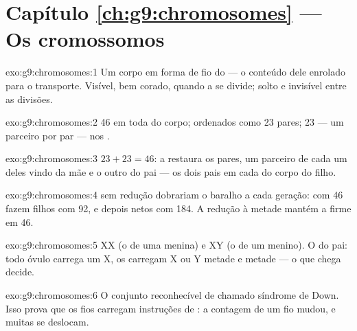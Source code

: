 \section*{Capítulo \ref{ch:g9:chromosomes} --- Os cromossomos}

\begin{solution}{exo:g9:chromosomes:1}
Um corpo em forma de fio do  --- o conteúdo dele
enrolado para o transporte. Visível, bem corado, quando a
 se divide; solto e invisível entre as divisões.
\end{solution}

\begin{solution}{exo:g9:chromosomes:2}
46 em toda  do corpo; ordenados como 23 pares; 23 ---
um parceiro por par --- nos .
\end{solution}

\begin{solution}{exo:g9:chromosomes:3}
$23 + 23 = 46$: a  restaura os pares, um parceiro
de cada um deles vindo da mãe e o outro do pai --- os dois
pais em cada  do corpo do filho.
\end{solution}

\begin{solution}{exo:g9:chromosomes:4}
 sem redução dobrariam o baralho a cada geração:
 com 46 fazem filhos com 92, e depois netos com 184.
A redução à metade mantém a  firme em 46.
\end{solution}

\begin{solution}{exo:g9:chromosomes:5}
XX (o  de uma menina) e XY (o de um menino). O do
pai: todo óvulo carrega um X, os 
carregam X ou Y metade e metade --- o  que
chega decide.
\end{solution}

\begin{solution}{exo:g9:chromosomes:6}
O conjunto reconhecível de  chamado síndrome
de Down. Isso prova que os fios carregam instruções de
: a contagem de um fio mudou, e muitas
 se deslocam.
\end{solution}

